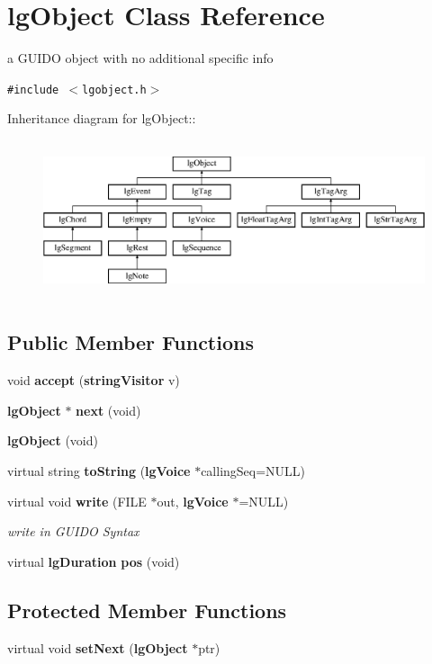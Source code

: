 \section{lg\-Object Class Reference}
\label{classlgObject}
a GUIDO object with no additional specific info  


{\tt \#include $<$lgobject.h$>$}

Inheritance diagram for lg\-Object::\begin{figure}[H]
\begin{center}
\leavevmode
\includegraphics[height=4.66667cm]{classlgObject}
\end{center}
\end{figure}
\subsection*{Public Member Functions}
\begin{CompactItemize}
\item 
void {\bf accept} ({\bf string\-Visitor} v)
\item 
{\bf lg\-Object} $\ast$ {\bf next} (void)
\item 
{\bf lg\-Object} (void)
\item 
virtual string {\bf to\-String} ({\bf lg\-Voice} $\ast$calling\-Seq=NULL)
\item 
virtual void {\bf write} (FILE $\ast$out, {\bf lg\-Voice} $\ast$=NULL)
\begin{CompactList}\small\item\em write in GUIDO Syntax \item\end{CompactList}\item 
virtual {\bf lg\-Duration} {\bf pos} (void)
\end{CompactItemize}
\subsection*{Protected Member Functions}
\begin{CompactItemize}
\item 
virtual void {\bf set\-Next} ({\bf lg\-Object} $\ast$ptr)
\end{CompactItemize}
